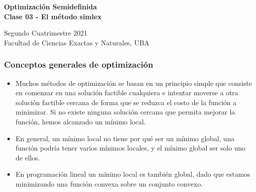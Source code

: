 \documentclass[aspectratio=169,12pt,spanish]{beamer}
\begin{document}

\begin{frame}

 \begin{center}

\Large\textbf{Optimización Semidefinida} \\
\large\textbf{Clase 03 - El método simlex}




\vspace{1cm}
 Segundo Cuatrimestre 2021
 \\
 {\small Facultad de Ciencias Exactas y Naturales, UBA}
 \end{center}

\end{frame}




\begin{frame}
\frametitle{Conceptos generales de optimización}

\begin{itemize}
\item Muchos métodos de optimización se basan en un principio simple que consiste en comenzar en una solución factible cualquiera e intentar moverse a otra solución factible cercana de forma que se reduzca el costo de la función a minimizar. Si no existe ninguna solución cercana que permita mejorar la función, hemos alcanzado un mínimo local.
\item En general, un mínimo local no tiene por qué ser un mínimo global, una función podría tener varios mínimos locales, y el mínimo global ser solo uno de ellos.
\item En programación lineal un mínimo local es también global, dado que estamos minimizando una función convexa sobre un conjunto convexo.
\end{itemize}

\end{frame}
\end{document}

